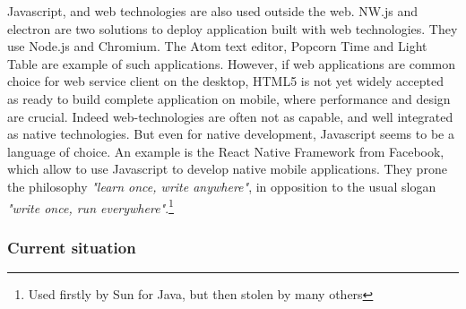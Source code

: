 Javascript, and web technologies are also used outside the web.
NW.js and electron are two solutions to deploy application built with web technologies.
They use Node.js and Chromium.
The Atom text editor, Popcorn Time and Light Table are example of such applications.
However, if web applications are common choice for web service client on the desktop, HTML5 is not yet widely accepted as ready to build complete application on mobile, where performance and design are crucial.
Indeed web-technologies are often not as capable, and well integrated as native technologies.
But even for native development, Javascript seems to be a language of choice.
An example is the React Native Framework from Facebook, which allow to use Javascript to develop native mobile applications.
They prone the philosophy \textit{"learn once, write anywhere"}, in opposition to the usual slogan \textit{"write once, run everywhere"}.\footnote{Used firstly by Sun for Java, but then stolen by many others}


\subsubsection{Current situation}









